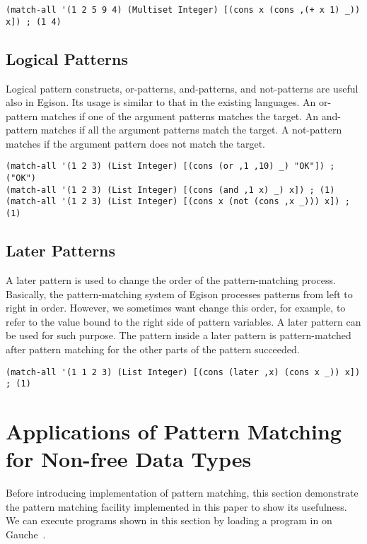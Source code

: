 \documentclass[acmlarge]{acmart}
\begin{document}
\begin{lstlisting}[language=egison]
(match-all '(1 2 5 9 4) (Multiset Integer) [(cons x (cons ,(+ x 1) _)) x]) ; (1 4)
\end{lstlisting}

\subsection{Logical Patterns}

Logical pattern constructs, or-patterns, and-patterns, and not-patterns are useful also in Egison.
Its usage is similar to that in the existing languages.
An or-pattern matches if one of the argument patterns matches the target.
An and-pattern matches if all the argument patterns match the target.
A not-pattern matches if the argument pattern does not match the target.

\begin{lstlisting}[language=egison]
(match-all '(1 2 3) (List Integer) [(cons (or ,1 ,10) _) "OK"]) ; ("OK")
(match-all '(1 2 3) (List Integer) [(cons (and ,1 x) _) x]) ; (1)
(match-all '(1 2 3) (List Integer) [(cons x (not (cons ,x _))) x]) ; (1)
\end{lstlisting}

\subsection{Later Patterns}

A later pattern is used to change the order of the pattern-matching process.
Basically, the pattern-matching system of Egison processes patterns from left to right in order.
However, we sometimes want change this order, for example, to refer to the value bound to the right side of pattern variables.
A later pattern can be used for such purpose.
The pattern inside a later pattern is pattern-matched after pattern matching for the other parts of the pattern succeeded.

\begin{lstlisting}[language=egison]
(match-all '(1 1 2 3) (List Integer) [(cons (later ,x) (cons x _)) x]) ; (1)
\end{lstlisting}


\section{Applications of Pattern Matching for Non-free Data Types}\label{apps}

Before introducing implementation of pattern matching, this section demonstrate the pattern matching facility implemented in this paper to show its usefulness.
We can execute programs shown in this section by loading a program in \cite{egisonScheme} on Gauche~\cite{gaucheWeb}.
\end{document}

